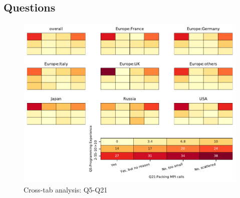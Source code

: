 
\subsection{Questions}


\begin{figure}
\begin{center}
\includegraphics[width=12cm]{../pdfs/Q5-Q21.pdf}
\caption{Cross-tab analysis: Q5-Q21}
\label{fig:Q5-Q21}
\end{center}
\end{figure}
